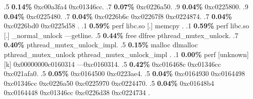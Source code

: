 \begin{profile}
{.5 \textbf{0.14\%} 0xc00a3fa4\newline {} 0xc01346cc. 
.7 \textbf{0.07\%} 0xc0226a50. 
.9 \textbf{0.04\%} 0xc0225800. 
.9 \textbf{0.04\%} 0xc0225480. 
.7 \textbf{0.04\%} 0xc0226b6c\newline {} 0xc02267f8\newline {} 0xc0224874. 
.7 \textbf{0.04\%} 0xc0226bd0\newline {} 0xc0225d58\newline {} . 
.1 \textbf{ 0.59\%} perf             libc.so                [.] memcpy\newline {} . 
.1 \textbf{ 0.59\%} perf             libc.so                [.] \_normal\_unlock\newline {} ---getline. 
.5 \textbf{0.44\%} free\newline {} dlfree\newline {} pthread\_mutex\_unlock. 
.7 \textbf{0.40\%} pthread\_mutex\_unlock\_impl. 
.5 \textbf{0.15\%} malloc\newline {} dlmalloc\newline {} pthread\_mutex\_unlock\newline {} pthread\_mutex\_unlock\_impl\newline {} . 
.1 \textbf{ 0.00\%} perf             [unknown]              [k] 0x00000000c0160314\newline {} ---0xc0160314. 
.5 \textbf{0.42\%} 0xc016468c\newline {} 0xc01346cc\newline {} 0xc021afa0. 
.5 \textbf{0.05\%} 0xc0164500\newline {} 0xc0223ae4. 
.5 \textbf{0.04\%} 0xc0164930\newline {} 0xc0164498\newline {} 0xc01346cc\newline {} 0xc0226a50\newline {} 0xc0225970\newline {} 0xc0224470. 
.5 \textbf{0.04\%} 0xc01648b4\newline {} 0xc0164448\newline {} 0xc01346cc\newline {} 0xc0226d38\newline {} 0xc0224734\newline {} . 
}
\end{profile}
